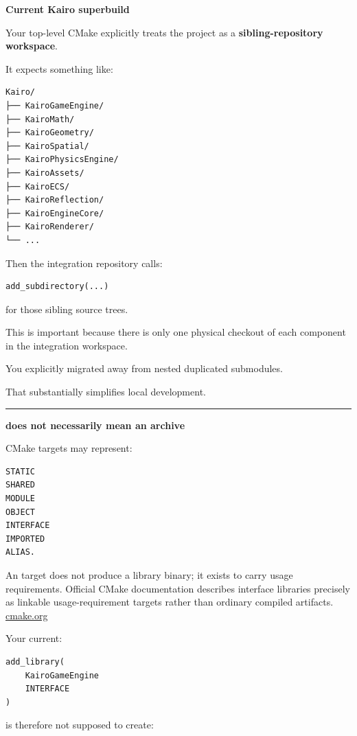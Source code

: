 \textbf{Current Kairo superbuild}

Your top-level  CMake explicitly treats the project as a \textbf{sibling-repository workspace}.

It expects something like:

\begin{verbatim}
Kairo/
├── KairoGameEngine/
├── KairoMath/
├── KairoGeometry/
├── KairoSpatial/
├── KairoPhysicsEngine/
├── KairoAssets/
├── KairoECS/
├── KairoReflection/
├── KairoEngineCore/
├── KairoRenderer/
└── ...
\end{verbatim}

Then the integration repository calls:

\begin{verbatim}
add_subdirectory(...)
\end{verbatim}

for those sibling source trees.

This is important because there is only one physical checkout of each component in the integration workspace.

You explicitly migrated away from nested duplicated submodules.

That substantially simplifies local development.

\begin{center}\rule{0.5\linewidth}{0.5pt}\end{center}

\textbf{ does not necessarily mean an archive}

CMake targets may represent:

\begin{verbatim}
STATIC
SHARED
MODULE
OBJECT
INTERFACE
IMPORTED
ALIAS.
\end{verbatim}

An  target does not produce a library binary; it exists to carry usage requirements. Official CMake documentation describes interface libraries precisely as linkable usage-requirement targets rather than ordinary compiled artifacts. \href{https://cmake.org/cmake/help/latest/command/add_library.html?utm_source=chatgpt.com}{cmake.org}

Your current:

\begin{verbatim}
add_library(
    KairoGameEngine
    INTERFACE
)
\end{verbatim}

is therefore not supposed to create:

